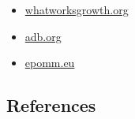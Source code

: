 \documentclass[
]{book}
\providecommand{\tightlist}{%
  \setlength{\itemsep}{0pt}\setlength{\parskip}{0pt}}
\begin{document}
\begin{itemize}
\tightlist
\item
  \href{https://whatworksgrowth.org/policy-reviews/transport/congestion-charging}{whatworksgrowth.org}
\item
  \href{https://www.adb.org/sites/default/files/publication/159940/introduction-congestion-charging.pdf}{adb.org}
\item
  \href{http://www.epomm.eu/newsletter/v2/content/2015/0415/doc/eupdate_en.pdf}{epomm.eu}
\end{itemize}

\hypertarget{references-3}{%
\subsection*{References}\label{references-3}}
\end{document}
